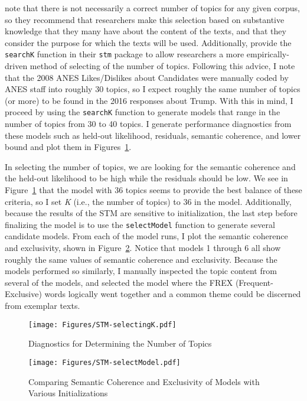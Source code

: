 \documentclass[12pt]{article}
\begin{document}
\begin{appendices}
\begin{refsection}
\textcite{roberts2014stm} note that there is not necessarily a correct number of topics for any given corpus, so they recommend that researchers make this selection based on substantive knowledge that they many have about the content of the texts, and that they consider the purpose for which the texts will be used. Additionally, \textcite{roberts2019stm} provide the \texttt{searchK} function in their \texttt{stm} package to allow researchers a more empirically-driven method of selecting of the number of topics. Following this advice, I note that the 2008 ANES Likes/Dislikes about Candidates were manually coded by ANES staff into roughly 30 topics, so I expect roughly the same number of topics (or more) to be found in the 2016 responses about Trump. With this in mind, I proceed by using the \texttt{searchK} function to generate models that range in the number of topics from 30 to 40 topics. I generate performance diagnostics from these models such as held-out likelihood, residuals, semantic coherence, and lower bound and plot them in Figures~\ref{fig:selectingK}. 

In selecting the number of topics, we are looking for the semantic coherence and the held-out likelihood to be high while the residuals should be low. We see in Figure~\ref{fig:selectingK} that the model with 36 topics seems to provide the best balance of these criteria, so I set \textit{K} (i.e., the number of topics) to 36 in the model. Additionally, because the results of the STM are sensitive to initialization, the last step before finalizing the model is to use the \texttt{selectModel} function to generate several candidate models. From each of the model runs, I plot the semantic coherence and exclusivity, shown in Figure~\ref{fig:selectModel}. Notice that models 1 through 6 all show roughly the same values of semantic coherence and exclusivity. Because the models performed so similarly, I manually inspected the topic content from several of the models, and selected the model where the FREX (Frequent-Exclusive) words logically went together and a common theme could be discerned from exemplar texts. 


\begin{figure}[t!]
	\centering
	\texttt{[image: Figures/STM-selectingK.pdf]}
	\caption{Diagnostics for Determining the Number of Topics}
		\label{fig:selectingK}
\end{figure}


\begin{figure}[t!]
	\centering
	\texttt{[image: Figures/STM-selectModel.pdf]}
	\caption{Comparing Semantic Coherence and Exclusivity of Models with Various Initializations}\label{fig:selectModel}
\end{figure}



\end{refsection}
\end{appendices}
\end{document}
